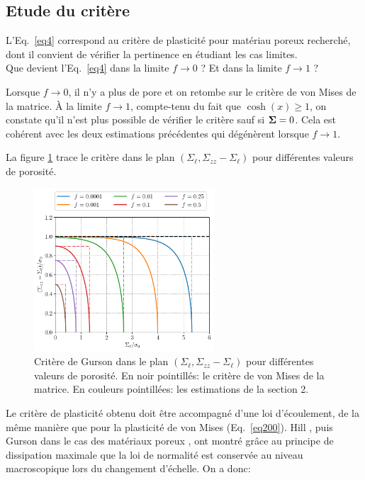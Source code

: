 \documentclass[french,english,12pt]{exam}
\begin{document}
\begin{questions}
\section{Etude du critère}
L'Eq.~\eqref{eq4} correspond au critère de plasticité pour matériau poreux recherché, dont il convient de vérifier la pertinence en étudiant les cas limites.\\

\question Que devient l'Eq.~\eqref{eq4} dans la limite $f \to 0$ ? Et dans la limite $f \to 1$ ?
\begin{solution}
Lorsque $f\to 0$, il n'y a plus de pore et on retombe sur le critère de von Mises de la matrice. \`A la limite $f\to 1$, compte-tenu du fait que $\cosh(x)\geq 1$, on constate qu'il n'est plus possible de vérifier le critère sauf si $\boldsymbol{\Sigma}=0$.
Cela est cohérent avec les deux estimations précédentes qui dégénèrent lorsque $f\to 1$.
\end{solution}

La figure \ref{fig:Gurson_crit} trace le critère dans le plan $(\Sigma_\ell, \Sigma_{zz} - \Sigma_\ell)$ pour différentes valeurs de porosité.

\begin{figure}
\begin{center}
\includegraphics[width=0.6\textwidth]{Gurson_cylinder}
\end{center}
\caption{Critère de Gurson dans le plan $(\Sigma_\ell, \Sigma_{zz} - \Sigma_\ell)$ pour différentes valeurs de porosité. En noir pointillés: le critère de von Mises de la matrice. En couleurs pointillées: les estimations de la section 2.}
\label{fig:Gurson_crit}
\end{figure}

Le critère de plasticité obtenu doit être accompagné d'une loi d'écoulement, de la même manière que pour la plasticité de von Mises (Eq.~\ref{eq200}). Hill \cite{hill}, puis Gurson dans le cas des matériaux poreux \cite{gurson}, ont montré grâce au principe de dissipation maximale que la loi de normalité est conservée au niveau macroscopique lors du changement d'échelle. On a donc:


\end{questions}
\end{document}
